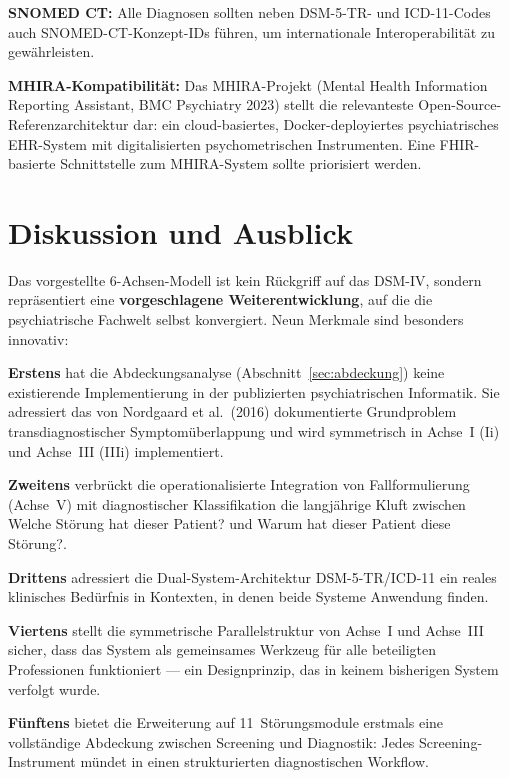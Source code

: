 \documentclass[11pt,a4paper]{article}
\begin{document}
\textbf{SNOMED CT:} Alle Diagnosen sollten neben DSM-5-TR- und ICD-11-Codes auch SNOMED-CT-Konzept-IDs f\"uhren, um internationale Interoperabilit\"at zu gew\"ahrleisten.

\textbf{MHIRA-Kompatibilit\"at:} Das MHIRA-Projekt (Mental Health Information Reporting Assistant, BMC Psychiatry 2023) stellt die relevanteste Open-Source-Referenzarchitektur dar: ein cloud-basiertes, Docker-deployiertes psychiatrisches EHR-System mit digitalisierten psychometrischen Instrumenten. Eine FHIR-basierte Schnittstelle zum MHIRA-System sollte priorisiert werden.


\section{Diskussion und Ausblick}
\label{sec:diskussion}

Das vorgestellte 6-Achsen-Modell ist kein R\"uckgriff auf das DSM-IV, sondern repr\"asentiert eine \textbf{vorgeschlagene Weiterentwicklung}, auf die die psychiatrische Fachwelt selbst konvergiert. Neun Merkmale sind besonders innovativ:

\textbf{Erstens} hat die Abdeckungsanalyse (Abschnitt~\ref{sec:abdeckung}) keine existierende Implementierung in der publizierten psychiatrischen Informatik. Sie adressiert das von Nordgaard et al.\ (2016) dokumentierte Grundproblem transdiagnostischer Symptom\"uberlappung und wird symmetrisch in Achse~I (Ii) und Achse~III (IIIi) implementiert.

\textbf{Zweitens} verbr\"uckt die operationalisierte Integration von Fallformulierung (Achse~V) mit diagnostischer Klassifikation die langj\"ahrige Kluft zwischen \glqq Welche St\"orung hat dieser Patient?\grqq{} und \glqq Warum hat dieser Patient diese St\"orung?\grqq{}.

\textbf{Drittens} adressiert die Dual-System-Architektur DSM-5-TR/ICD-11 ein reales klinisches Bed\"urfnis in Kontexten, in denen beide Systeme Anwendung finden.

\textbf{Viertens} stellt die symmetrische Parallelstruktur von Achse~I und Achse~III sicher, dass das System als gemeinsames Werkzeug f\"ur alle beteiligten Professionen funktioniert --- ein Designprinzip, das in keinem bisherigen System verfolgt wurde.

\textbf{F\"unftens} bietet die Erweiterung auf 11~St\"orungsmodule erstmals eine vollst\"andige Abdeckung zwischen Screening und Diagnostik: Jedes Screening-Instrument m\"undet in einen strukturierten diagnostischen Workflow.
\end{document}
